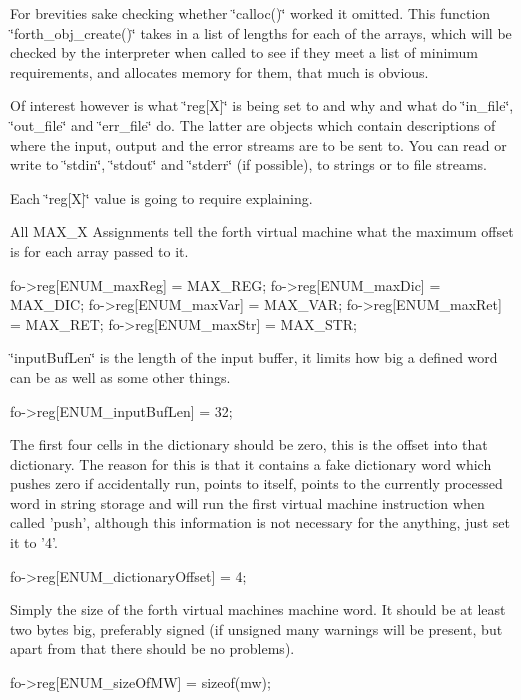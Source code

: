 For brevities sake checking whether \char`\"{}calloc()\char`\"{} worked it omitted. This function \char`\"{}forth\-\_\-obj\-\_\-create()\char`\"{} takes in a list of lengths for each of the arrays, which will be checked by the interpreter when called to see if they meet a list of minimum requirements, and allocates memory for them, that much is obvious.

Of interest however is what \char`\"{}reg\mbox{[}\-X\mbox{]}\char`\"{} is being set to and why and what do \char`\"{}in\-\_\-file\char`\"{}, \char`\"{}out\-\_\-file\char`\"{} and \char`\"{}err\-\_\-file\char`\"{} do. The latter are objects which contain descriptions of where the input, output and the error streams are to be sent to. You can read or write to \char`\"{}stdin\char`\"{}, \char`\"{}stdout\char`\"{} and \char`\"{}stderr\char`\"{} (if possible), to strings or to file streams.

Each \char`\"{}reg\mbox{[}\-X\mbox{]}\char`\"{} value is going to require explaining.

All M\-A\-X\-\_\-\-X Assignments tell the forth virtual machine what the maximum offset is for each array passed to it. \begin{DoxyVerb}fo->reg[ENUM_maxReg] = MAX_REG;
fo->reg[ENUM_maxDic] = MAX_DIC;
fo->reg[ENUM_maxVar] = MAX_VAR;
fo->reg[ENUM_maxRet] = MAX_RET;
fo->reg[ENUM_maxStr] = MAX_STR;
\end{DoxyVerb}


\char`\"{}input\-Buf\-Len\char`\"{} is the length of the input buffer, it limits how big a defined word can be as well as some other things. \begin{DoxyVerb}fo->reg[ENUM_inputBufLen] = 32;
\end{DoxyVerb}


The first four cells in the dictionary should be zero, this is the offset into that dictionary. The reason for this is that it contains a fake dictionary word which pushes zero if accidentally run, points to itself, points to the currently processed word in string storage and will run the first virtual machine instruction when called 'push', although this information is not necessary for the anything, just set it to '4'. \begin{DoxyVerb}fo->reg[ENUM_dictionaryOffset] = 4;
\end{DoxyVerb}


Simply the size of the forth virtual machines machine word. It should be at least two bytes big, preferably signed (if unsigned many warnings will be present, but apart from that there should be no problems). \begin{DoxyVerb}fo->reg[ENUM_sizeOfMW] = sizeof(mw);
\end{DoxyVerb}


